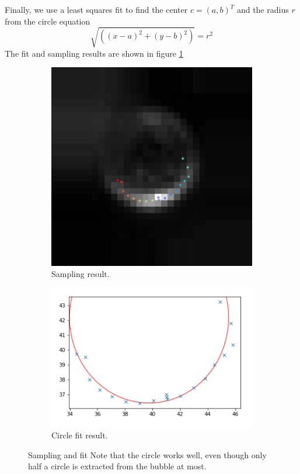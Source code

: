 				
				Finally, we use a least squares fit to find the center $c = (a,b)^T$ and the radius $r$ from the circle equation
				\begin{equation}
					\sqrt{ \left( (x-a)^2 + (y-b)^2 \right)} = r^2
				\end{equation}
				The fit and sampling results are shown in figure \ref{fig:fit_circle_fit_result}
				
				\begin{figure}
				
					\begin{subfigure}[t]{.50\textwidth}
						\centering
						\includegraphics[scale=.8]{images/sampling_result.png}
						\caption{Sampling result. }
					\end{subfigure}					


					\begin{subfigure}[t]{.55\textwidth}
						\centering
						\includegraphics[scale=.7]{graphs/circle_fit.png}
						\caption{Circle fit result.}
					\end{subfigure}
					
					
					\caption{Sampling and fit Note that the circle works well, even though only half a circle is extracted from the bubble at most. }
					\label{fig:fit_circle_fit_result}
				\end{figure}



